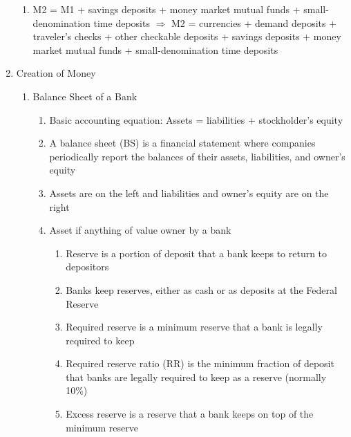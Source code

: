 \documentclass[12pt]{article}
\begin{document}
\begin{enumerate}
\begin{enumerate}
          \item M2 = M1 + savings deposits + money market mutual funds + small-denomination time deposits $\Rightarrow$ M2 = currencies + demand deposits + traveler's checks + other checkable deposits + savings deposits + money market mutual funds + small-denomination time deposits

        \end{enumerate}

      \item Creation of Money

        \begin{enumerate}

          \item Balance Sheet of a Bank

            \begin{enumerate}

              \item Basic accounting equation: Assets = liabilities + stockholder's equity

              \item A balance sheet (BS) is a financial statement where companies periodically report the balances of their assets, liabilities, and owner's equity

              \item Assets are on the left and liabilities and owner's equity are on the right

              \item Asset if anything of value owner by a bank

                \begin{enumerate}

                  \item Reserve is a portion of deposit that a bank keeps to return to depositors

                  \item Banks keep reserves, either as cash or as deposits at the Federal Reserve

                  \item Required reserve is a minimum reserve that a bank is legally required to keep

                  \item Required reserve ratio (RR) is the minimum fraction of deposit that banks are legally required to keep as a reserve (normally 10\%)

                  \item Excess reserve is a reserve that a bank keeps on top of the minimum reserve


\end{enumerate}
\end{enumerate}
\end{enumerate}
\end{enumerate}
\end{document}
